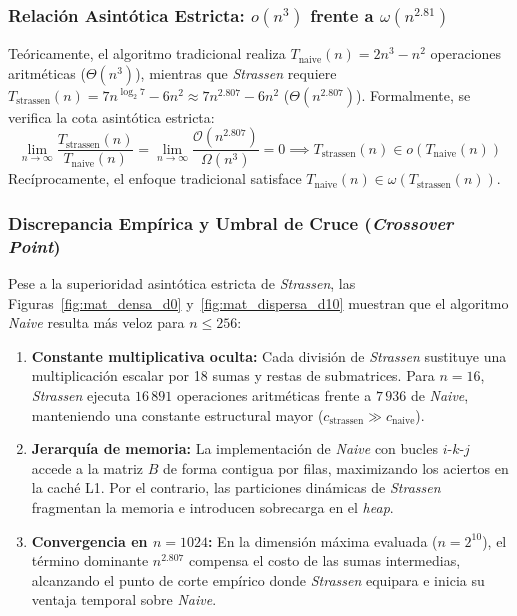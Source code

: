 \subsubsection{Relación Asintótica Estricta: $o(n^3)$ frente a $\omega(n^{2.81})$}
Teóricamente, el algoritmo tradicional realiza $T_{\text{naive}}(n) = 2n^3 - n^2$ operaciones aritméticas ($\Theta(n^3)$), mientras que \textit{Strassen} requiere $T_{\text{strassen}}(n) = 7n^{\log_2 7} - 6n^2 \approx 7n^{2.807} - 6n^2$ ($\Theta(n^{2.807})$). Formalmente, se verifica la cota asintótica estricta:
\begin{equation}
\lim_{n \to \infty} \frac{T_{\text{strassen}}(n)}{T_{\text{naive}}(n)} = \lim_{n \to \infty} \frac{\mathcal{O}(n^{2.807})}{\Omega(n^3)} = 0 \implies T_{\text{strassen}}(n) \in o(T_{\text{naive}}(n))
\end{equation}
Recíprocamente, el enfoque tradicional satisface $T_{\text{naive}}(n) \in \omega(T_{\text{strassen}}(n))$.

\subsubsection{Discrepancia Empírica y Umbral de Cruce (\textit{Crossover Point})}
Pese a la superioridad asintótica estricta de \textit{Strassen}, las Figuras~\ref{fig:mat_densa_d0} y~\ref{fig:mat_dispersa_d10} muestran que el algoritmo \textit{Naive} resulta más veloz para $n \le 256$:
\begin{enumerate}
    \item \textbf{Constante multiplicativa oculta:} Cada división de \textit{Strassen} sustituye una multiplicación escalar por 18 sumas y restas de submatrices. Para $n=16$, \textit{Strassen} ejecuta $16\,891$ operaciones aritméticas frente a $7\,936$ de \textit{Naive}, manteniendo una constante estructural mayor ($c_{\text{strassen}} \gg c_{\text{naive}}$).
    \item \textbf{Jerarquía de memoria:} La implementación de \textit{Naive} con bucles $i\text{-}k\text{-}j$ accede a la matriz $B$ de forma contigua por filas, maximizando los aciertos en la caché L1. Por el contrario, las particiones dinámicas de \textit{Strassen} fragmentan la memoria e introducen sobrecarga en el \textit{heap}.
    \item \textbf{Convergencia en $n=1024$:} En la dimensión máxima evaluada ($n=2^{10}$), el término dominante $n^{2.807}$ compensa el costo de las sumas intermedias, alcanzando el punto de corte empírico donde \textit{Strassen} equipara e inicia su ventaja temporal sobre \textit{Naive}.
\end{enumerate}

